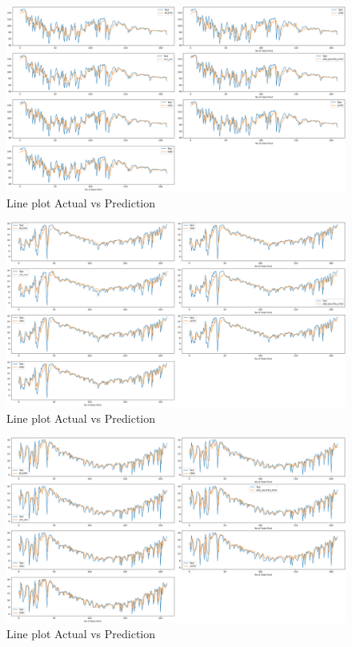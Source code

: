 \documentclass[a4paper,fleqn]{cas-sc}
\begin{document}
      
      \begin{figure}[!ht]
      \centering
      \includegraphics[width=\textwidth]{AHMEDABAD_act vs pred}
      \caption{Line plot Actual vs Prediction}
      \label{Line plot2}
      \end{figure}
      
      
      \begin{figure}[!ht]
      \centering
      \includegraphics[width=\textwidth]{AHMEDABAD2._act vs pred}
      \caption{Line plot Actual vs Prediction}
      \label{Line plot3}
      \end{figure}
      
      
      \begin{figure}[!ht]
      \centering
      \includegraphics[width=\textwidth]{Ajmer_act vs pred (2)}
      \caption{Line plot Actual vs Prediction}
      \label{Line plot4}
      \end{figure}
      
\end{document}
